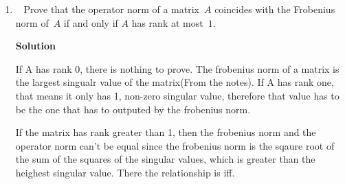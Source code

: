 \documentclass[11pt]{article}
\newcommand\score[1]{\marginpar{\vspace{-2ex}\color{blue}{#1/3}}\hspace{-1ex}}
\newcommand\0{\mathbf{0}}
\newcommand\<{\langle}
\renewcommand\>{\rangle}
\begin{document}
\begin{enumerate}
\textbf{Solution}

$$
A^{T}A=
\begin{bmatrix}
 2& 0\\
 3& 2 
\end{bmatrix}
\begin{bmatrix}
  2&3\\
  0&2\\
\end{bmatrix}
=
\begin{bmatrix}
  4&6\\
  6&13
\end{bmatrix}
$$

The eigenvalues of are 16 and 1, therefore the singular values are 
4 and 1. Therefore the norm operator is 4, and the minimum length of unit vectors
is 1.

The eigen valeus of $A^{T}A$ are $(1,2)$ and $(-2,1)$ for the singular values 4 and 1 
respectively. So the vector that achieve the maximum and the minimum are precisely the normalized version of 
this vectors.

From this we also find $V^{*}$.

$$
V=\begin{bmatrix}
  1/\sqrt5 & -2/\sqrt5\\
  2/\sqrt5& 1/\sqrt{5}
\end{bmatrix}
$$

To W we just do $w_[i]=\frac{1}{\sigma_{i}}A v_{i}$.

$$
W=\begin{bmatrix}
  2/\sqrt5 & -1/\sqrt5\\
  -1/\sqrt5 & 2/\sqrt5
\end{bmatrix}
$$
So $A=W \Sigma V^{*}$, where $\Sigma$ is a just an operator is the singular values in the diagonal.

\item\ \score{3}%
Prove that the operator norm of a matrix~$A$ coincides with the
Frobenius norm of~$A$ if and only if $A$ has rank at most~$1$.

\textbf{Solution}

If A has rank 0, there is nothing to prove. The frobenius norm of a matrix is
the largest singualr value of the matrix(From the notes). If A has rank one, that
means it only has 1, non-zero singular value, therefore that value has to be the 
one that has to outputed by the frobenius norm.

If the matrix has rank greater than 1, then the frobenius norm and the 
operator norm can't be equal since the frobenius norm is the sqaure root of the sum 
of the squares of the singular values, which is greater than
the heighest singular value. There the relationship is iff.

\end{enumerate}


\end{document}
